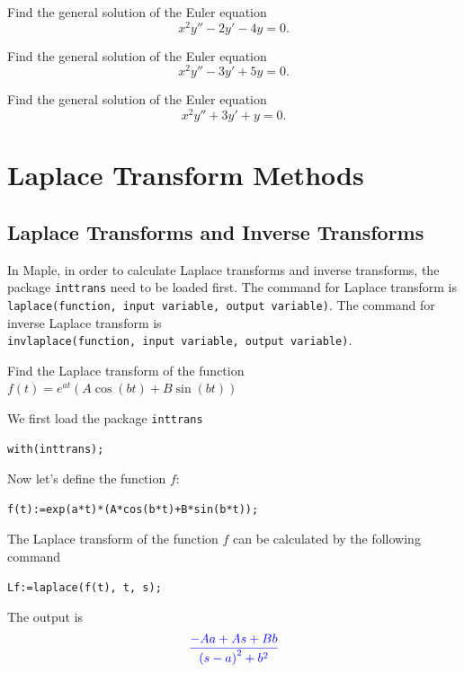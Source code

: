 \documentclass[
  12pt]{elegantbook}
\begin{document}
\begin{exercise}
Find the general solution of the Euler equation
\[x^2y''-2y'-4y=0.\]
\end{exercise}

\begin{exercise}
Find the general solution of the Euler equation
\[x^2y''-3y'+5y=0.\]
\end{exercise}

\begin{exercise}
Find the general solution of the Euler equation
\[x^2y''+3y'+y=0.\]
\end{exercise}

\hypertarget{laplace-transform-methods}{%
\chapter{Laplace Transform Methods}\label{laplace-transform-methods}}

\hypertarget{laplace-transforms-and-inverse-transforms}{%
\section{Laplace Transforms and Inverse Transforms}\label{laplace-transforms-and-inverse-transforms}}

In Maple, in order to calculate Laplace transforms and inverse transforms, the package \texttt{inttrans} need to be loaded first. The command for Laplace transform is \texttt{laplace(function,\ input\ variable,\ output\ variable)}. The command for inverse Laplace transform is \texttt{invlaplace(function,\ input\ variable,\ output\ variable)}.

\begin{example}
Find the Laplace transform of the function \(f(t)=e^{at}(A\cos(bt)+B\sin(bt))\)
\end{example}

\begin{solution}
We first load the package \texttt{inttrans}

\begin{verbatim}
with(inttrans);
\end{verbatim}

Now let's define the function \(f\):

\begin{verbatim}
f(t):=exp(a*t)*(A*cos(b*t)+B*sin(b*t));
\end{verbatim}

The Laplace transform of the function \(f\) can be calculated by the following command

\begin{verbatim}
Lf:=laplace(f(t), t, s);
\end{verbatim}

The output is
\[{\color{blue}{\frac{-A a +A s +B b}{\left(s -a \right)^{2}+b^{2}}}}\]
\end{solution}
\end{document}
